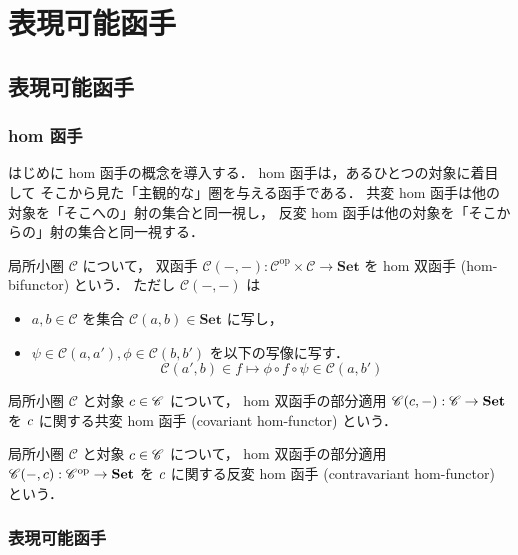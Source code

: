 \documentclass[titlepage]{ltjsreport}
\newcommand{\cat}[1]{\mathscr{#1}}
\newcommand{\obj}[1]{\lowercase{#1}}
\newcommand{\objs}[1]{#1}
\newcommand{\mrp}[3]{{#1}:{#2}\to{#3}}
\newcommand{\mrps}[3]{#1(#2,#3)}
\newcommand{\op}[1]{{#1}^{\mathrm{op}}}
\newcommand{\set}{\mathbf{Set}}
\begin{document}
\chapter{表現可能函手}

\section{表現可能函手}

\subsection{hom 函手}

はじめに hom 函手の概念を導入する．
hom 函手は，あるひとつの対象に着目して
そこから見た「主観的な」圏を与える函手である．
共変 hom 函手は他の対象を「そこへの」射の集合と同一視し，
反変 hom 函手は他の対象を「そこからの」射の集合と同一視する．
\begin{definition}
  \def\C{\cat{C}}%
  局所小圏 $\C$ について，
  双函手 $\mrp{\C(-,-)}{\op{\C}\times\C}{\set}$
  を hom 双函手 (hom-bifunctor) という．
  ただし $\mrps{\C}{-}{-}$ は
  \begin{itemize}
    \item $a,b\in\C$ を集合 $\mrps{\C}{a}{b}\in\set$ に写し，
    \item $\psi\in\mrps{\C}{a}{a'},\phi\in\mrps{\C}{b}{b'}$
          を以下の写像に写す．
          \begin{equation}
            \mrps{\C}{a'}{b}\in f\mapsto\phi\circ f\circ\psi\in\mrps{\C}{a}{b'}
          \end{equation}
  \end{itemize}
\end{definition}
\begin{definition}[共変 hom 函手]\label{def:covariant-hom-functor}
  \def\C{\cat{C}}%
  \def\c{\obj{c}}%
  局所小圏 $\C$ と対象 $\c\in\objs{\C}$ について，
  hom 双函手の部分適用 $\mrp{\mrps{\C}{\c}{-}}{\C}{\set}$ を
  $\c$ に関する共変 hom 函手 (covariant hom-functor) という．
\end{definition}
\begin{definition}[反変 hom 函手]
  \def\C{\cat{C}}%
  \def\c{\obj{c}}%
  局所小圏 $\C$ と対象 $\c\in\objs{\C}$ について，
  hom 双函手の部分適用 $\mrp{\mrps{\C}{-}{\c}}{\op{\C}}{\set}$ を
  $\c$ に関する反変 hom 函手 (contravariant hom-functor) という．
\end{definition}

\subsection{表現可能函手}
\end{document}
